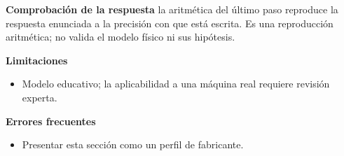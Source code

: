 \documentclass[10pt,openany]{book}
\begin{document}
\begin{tcolorbox}[title={Problema resuelto 3}, studiumworked, breakable]
\noindent\textbf{Comprobación de la respuesta} la aritmética del último paso reproduce la respuesta enunciada a la precisión con que está escrita. Es una reproducción aritmética; no valida el modelo físico ni sus hipótesis.

\noindent\textbf{Limitaciones}
\begin{itemize}
\item Modelo educativo; la aplicabilidad a una máquina real requiere revisión experta.
\end{itemize}

\noindent\textbf{Errores frecuentes}
\begin{itemize}
\item Presentar esta sección como un perfil de fabricante.
\end{itemize}
\end{tcolorbox}
\end{document}
